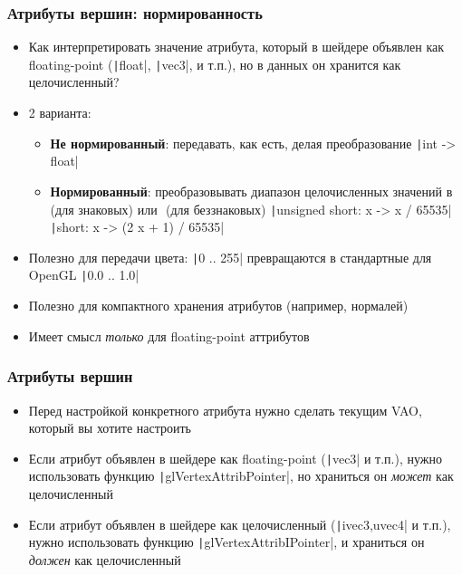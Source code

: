 \documentclass[10pt]{beamer}
\begin{document}
\begin{frame}[fragile]
\frametitle{Атрибуты вершин: нормированность}
\begin{itemize}
\item Как интерпретировать значение атрибута, который в шейдере объявлен как floating-point (\texttt|float|, \texttt|vec3|, и т.п.), но в данных он хранится как целочисленный?
\pause
\item 2 варианта:
\begin{itemize}
\item \textbf{Не нормированный}: передавать, как есть, делая преобразование \texttt|int -> float|
\pause
\item \textbf{Нормированный}: преобразовывать диапазон целочисленных значений в \begin{math}[-1, 1]\end{math} (для знаковых) или \begin{math}[0, 1]\end{math} (для беззнаковых)
\newline
\texttt|unsigned short: x -> x / 65535|
\newline
\texttt|short: x -> (2 x + 1) / 65535|
\end{itemize}
\pause
\item Полезно для передачи цвета: \texttt|0 .. 255| превращаются в стандартные для OpenGL \texttt|0.0 .. 1.0|
\pause
\item Полезно для компактного хранения атрибутов (например, нормалей)
\pause
\item Имеет смысл \textit{только} для floating-point аттрибутов
\end{itemize}
\end{frame}

\begin{frame}[fragile]
\frametitle{Атрибуты вершин}
\begin{itemize}
\item Перед настройкой конкретного атрибута нужно сделать текущим VAO, который вы хотите настроить
\pause
\item Если атрибут объявлен в шейдере как floating-point (\texttt|vec3| и т.п.), нужно использовать функцию \texttt|glVertexAttribPointer|, но храниться он \textit{может} как целочисленный
\pause
\item Если атрибут объявлен в шейдере как целочисленный (\texttt|ivec3,uvec4| и т.п.), нужно использовать функцию \texttt|glVertexAttribIPointer|, и храниться он \textit{должен} как целочисленный
\end{itemize}
\end{frame}
\end{document}

